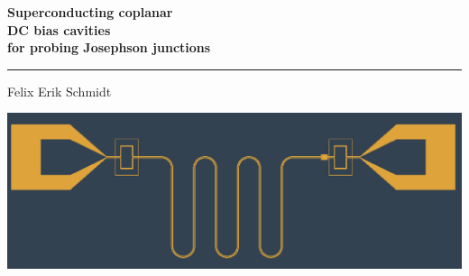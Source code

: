\documentclass{dissertation-edit}
\begin{document}
{\linespread{1.1}\raggedright\bfseries\Huge Superconducting coplanar \\DC bias cavities\\ for probing Josephson junctions\par
\vspace{0.5cm}
\hrule
\vspace{0.5cm}
\LARGE Felix Erik Schmidt	
}
\vspace{10cm}

\includegraphics[width=\linewidth]{../title/cover_circuit/cover_circuit}

\end{document}
